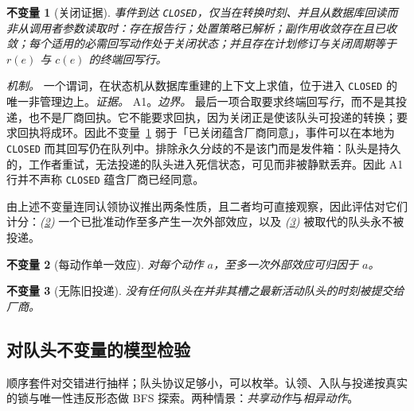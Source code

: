 \documentclass[acmsmall,manuscript,review,anonymous]{acmart}
\renewcommand{\_}{\discretionary{\textunderscore}{}{\textunderscore}}
\newtheorem{invariant}{不变量}
\begin{document}
\begin{invariant}[关闭证据]
\label{inv:close}
事件到达 \texttt{CLOSED}，仅当在转换时刻、并且从数据库回读而非从调用者参数读取时：存在报告行；处置策略已解析；副作用收敛存在且已收敛；每个适用的必需回写动作处于关闭状态；并且存在计划修订与关闭周期等于 $r(e)$ 与 $c(e)$ 的终端回写行。
\end{invariant}

\noindent\emph{机制。} 一个谓词，在状态机从数据库重建的上下文上求值，位于进入 \texttt{CLOSED} 的唯一非管理边上。\emph{证据。} {A1}。\emph{边界。} 最后一项合取要求终端回写\emph{行}，而不是其投递，也不是厂商回执。它不能要求回执，因为关闭正是使该队头可投递的转换；要求回执将成环。因此不变量~\ref{inv:close} 弱于「已关闭蕴含厂商同意」，事件可以在本地为 \texttt{CLOSED} 而其回写仍在队列中。排除永久分歧的不是该门而是发件箱：队头是持久的，工作者重试，无法投递的队头进入死信状态，可见而非被静默丢弃。因此 {A1} 行并不声称 \texttt{CLOSED} 蕴含厂商已经同意。

由上述不变量连同认领协议推出两条性质，且二者均可直接观察，因此评估对它们计分：\emph{(\ref{inv:effect})} 一个已批准动作至多产生一次外部效应，以及 \emph{(\ref{inv:stale})} 被取代的队头永不被投递。

\begin{invariant}[每动作单一效应]
\label{inv:effect}
对每个动作 $a$，至多一次外部效应可归因于 $a$。
\end{invariant}

\begin{invariant}[无陈旧投递]
\label{inv:stale}
没有任何队头在并非其槽之最新活动队头的时刻被提交给厂商。
\end{invariant}

\subsection{对队头不变量的模型检验}
\label{sec:inv-model}

顺序套件对交错进行抽样；队头协议足够小，可以枚举。认领、入队与投递按真实的锁与唯一性违反形态做 {BFS} 探索。两种情景：\emph{共享动作}与\emph{相异动作}。
\end{document}
